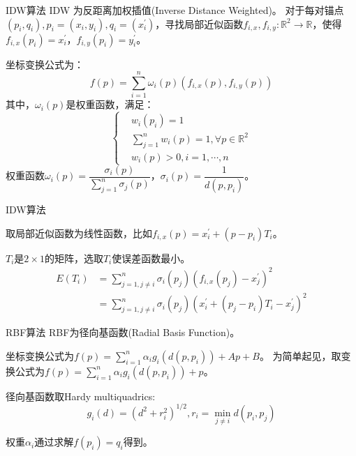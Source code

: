 \documentclass[10.5pt]{beamer}
\begin{document}
\begin{frame}{IDW算法}
 IDW 为反距离加权插值(Inverse Distance Weighted)。
 对于每对锚点$(p_{i},q_{i}),p_{i}= (x_{i},y_{i}),q_{i} = (x^{'}_{i})$，寻找局部近似函数$f_{i,x},f_{i,y}:\mathbb{R}^{2} \rightarrow \mathbb{R}$，使得$f_{i,x}(p_{i}) = x_{i}^{'}$，$f_{i,y}(p_{i}) = y_{i}^{'}$。
 
 坐标变换公式为：
 $$f(p) = \sum\limits_{i=1}^{n} \omega_{i}(p) (f_{i,x}(p),f_{i,y}(p))$$
 其中，$\omega_{i}(p)$是权重函数，满足：
 \begin{equation}\nonumber
 \left\{
 \begin{aligned}
 & w_{i}(p_{i}) = 1 \\
 & \sum\limits_{j=1}^{n} w_{i}(p) = 1,\forall p \in \mathbb{R}^{2} \\
 & w_{i}(p) > 0, i = 1,\cdots,n
 \end{aligned}
  \right.
 \end{equation}
 权重函数$\omega_{i}(p) = \dfrac{\sigma_{i}(p)}{\sum_{j=1}^{n} \sigma_{j}(p)}$，$\sigma
_{i}(p) = \dfrac{1}{d(p,p_{i})}$。

\end{frame}

\begin{frame}{IDW算法}
  
取局部近似函数为线性函数，比如$f_{i,x}(p) = x_{i}^{'} + (p - p_{i})T_{i}$。

$T_{i}$是$2 \times 1$的矩阵，选取$T_{i}$使误差函数最小。
\begin{equation}\nonumber
\begin{aligned}
E(T_{i})
&= \sum\limits_{j=1,j\neq i}^{n} \sigma_{i}(p_{j}) (f_{i,x}(p_{j}) - x_{j}^{'})^{2}  \\
&= \sum\limits_{j=1,j \neq i}^{n} \sigma_{i}(p_{j}) (x_{i}^{'} + (p_{j} - p_{i})T_{i} - x_{j}^{'})^{2}
\end{aligned}
\end{equation}
\end{frame}



\begin{frame}{RBF算法}
RBF为径向基函数(Radial Basis Function)。

坐标变换公式为$f(p) = \sum\limits_{i=1}^{n} \alpha_{i} g_{i}(d(p,p_{i})) + Ap + B$。
为简单起见，取变换公式为$f(p) = \sum\limits_{i=1}^{n} \alpha_{i} g_{i}(d(p,p_{i})) + p$。

径向基函数取Hardy multiquadrics:
$$g_{i}(d) = (d^2 + r_{i}^{2})^{1/2},r_{i} = \min_{j \neq i}{d(p_{i},p_{j})}$$

权重$\alpha_{i}$通过求解$f(p_{i}) = q_{i}$得到。

\end{frame}
\end{document}
